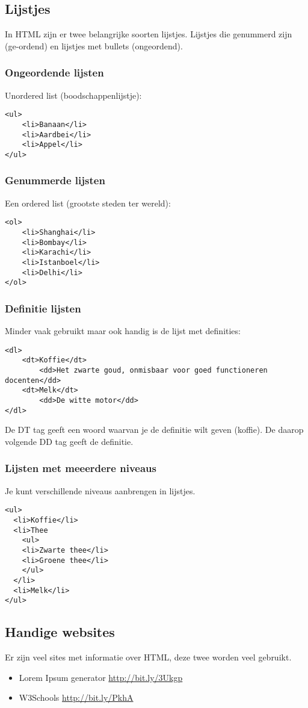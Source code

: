 \documentclass[8pt,pagesize,footinclude=false,headinclude=false]{scrartcl}
\begin{document}
\begin{multicols*}{4}
\subsection*{Lijstjes}
In HTML zijn er twee belangrijke soorten lijstjes. Lijstjes die genummerd zijn (ge-ordend) en lijstjes met bullets (ongeordend).

\subsubsection*{Ongeordende lijsten}
Unordered list (boodschappenlijstje): 
\begin{lstlisting}
<ul>
	<li>Banaan</li>
	<li>Aardbei</li>
	<li>Appel</li>
</ul>
\end{lstlisting}

\subsubsection*{Genummerde lijsten}
Een ordered list (grootste steden ter wereld):
\begin{lstlisting}
<ol>
	<li>Shanghai</li>
	<li>Bombay</li>
	<li>Karachi</li>
	<li>Istanboel</li>
	<li>Delhi</li>
</ol>
\end{lstlisting}

\subsubsection*{Definitie lijsten}
Minder vaak gebruikt maar ook handig is de lijst met definities:
\begin{lstlisting}
<dl>
	<dt>Koffie</dt>
		<dd>Het zwarte goud, onmisbaar voor goed functioneren docenten</dd>
	<dt>Melk</dt>
		<dd>De witte motor</dd>
</dl>
\end{lstlisting}
\noindent De DT tag geeft een woord waarvan je de definitie wilt geven (koffie). De daarop volgende DD tag geeft de definitie.

\subsubsection*{Lijsten met meeerdere niveaus}
Je kunt verschillende niveaus aanbrengen in lijstjes.

\begin{lstlisting}
<ul>
  <li>Koffie</li>
  <li>Thee
    <ul>
    <li>Zwarte thee</li>
    <li>Groene thee</li>
    </ul>
  </li>
  <li>Melk</li>
</ul>
\end{lstlisting}

\subsection*{Handige websites}
Er zijn veel sites met informatie over HTML, deze twee worden veel gebruikt.
\begin{itemize}
	\item Lorem Ipsum generator \url{http://bit.ly/3Ukgp} 
	\item W3Schools \url{http://bit.ly/PkhA}
\end{itemize}


\end{multicols*}
\end{document}
